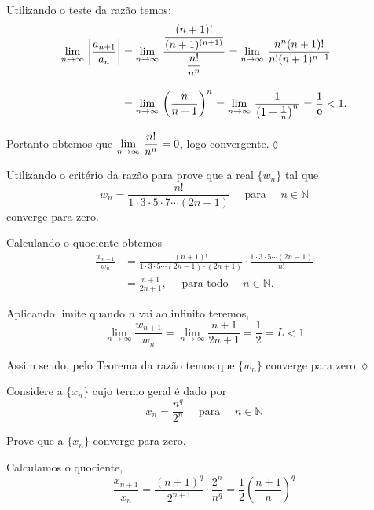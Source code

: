 \solo Utilizando o teste da raz\~{a}o temos:
\begin{align*}
  \displaystyle{\lim_{n\to \infty}\,{\left|\frac{a_{n+1}}{a_n}\right|}_{}}&=\displaystyle{\lim_{n\to \infty}\,{\frac{\displaystyle{\frac{(n+1)!}{(n+1)^{(n+1)}}}}
  {\displaystyle{\frac{n!}{n^n}}}}_{}}=\displaystyle{\lim_{n\to \infty}\,{\frac{n^n(n+1)!}{n!(n+1)^{n+1}}}_{}}\\[2ex]
     &=\displaystyle{\lim_{n\to \infty}\,{\left(\frac{n}{n+1}\right)^n}_{}}=\displaystyle{\lim_{n\to \infty}\,{\frac{1}
     {\left(1+\frac{1}{n}\right)^n}}_{}}=\frac{1}{\mathbf{e}}<1.
\end{align*}

Portanto obtemos que $\displaystyle{\lim_{n\to \infty}\,{\frac{n!}{n^n}}_{}}=0$, logo
convergente.\hfill \(\lozenge\)


\begin{exer}
Utilizando o crit\'{e}rio da raz\~{a}o para \seqs prove que a \seq real $\{w_n\}$ tal que
\begin{equation*}
    w_n=\frac{n!}{1\cdot 3\cdot 5\cdot 7\cdots (2n-1)}\quad \text{ para }\quad n\in \mathbb{N}
\end{equation*}
converge para zero.
\end{exer}

\solo Calculando o quociente obtemos
\begin{align*}
    \frac{w_{n+1}}{w_n}&=\frac{(n+1)!}{1\cdot 3\cdot 5\cdots (2n-1)\cdot(2n+1)}
    \cdot\frac{1\cdot 3\cdot 5\cdots (2n-1)}{n!}\\[2ex]
    &=\frac{n+1}{2n+1},\quad \text{ para todo }\quad n\in \mathbb{N}.
\end{align*}

Aplicando limite quando $n$ vai ao infinito teremos,
\begin{equation*}
    \lim_{n\to\infty}\frac{w_{n+1}}{w_n}=\lim_{n\to\infty}\frac{n+1}{2n+1}=\frac{1}{2}=L<1
\end{equation*}

Assim sendo, pelo Teorema da raz\~{a}o temos que \seq $\{w_n\}$ converge para zero.\hfill \(\lozenge\)

\begin{exer}
Considere a \seq $\{ x_n\}$ cujo termo geral \'{e} dado por
\begin{equation*}
    x_n=\dfrac{n^q}{2^n}\quad \text{ para }\quad n\in \mathbb{N}
\end{equation*}

Prove que a \seq $\{x_n\}$ converge para zero.
\end{exer}

\solo Calculamos o quociente,
\begin{equation*}
    \frac{x_{n+1}}{x_n}=\frac{(n+1)^q}{2^{n+1}}\cdot \frac{2^n}{n^q}=
    \frac{1}{2}\left(\frac{n+1}{n}\right)^q
\end{equation*}

